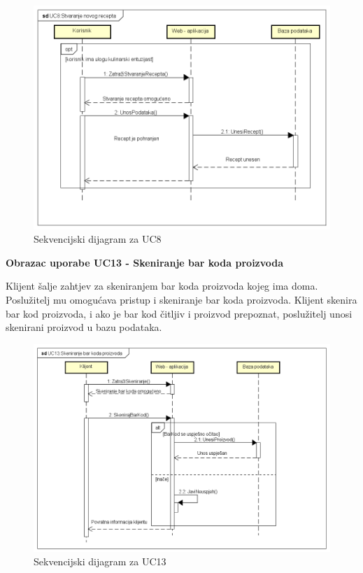 					
				\begin{figure}[H]
			\includegraphics[scale=0.4]{dijagrami/SEQ_UC8.png} %
			\centering
			\caption{Sekvencijski dijagram za UC8}
			\label{SEQ_UC8}
		\end{figure}
				
			\begin{large}{\textbf{Obrazac uporabe UC13 - Skeniranje bar koda proizvoda}}\end{large}

			Klijent šalje zahtjev za skeniranjem bar koda proizvoda kojeg ima doma. Poslužitelj mu omogućava pristup i skeniranje bar koda proizvoda. Klijent skenira bar kod proizvoda, i ako je bar kod čitljiv i proizvod prepoznat, poslužitelj unosi skenirani proizvod u bazu podataka.
				
					
				\begin{figure}[H]
			\includegraphics[scale=0.4]{dijagrami/SEQ_UC13.png} %
			\centering
			\caption{Sekvencijski dijagram za UC13}
			\label{SEQ_UC13}
		\end{figure}
				
